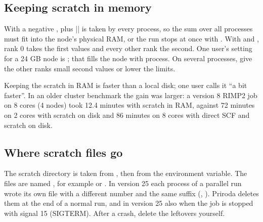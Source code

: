 \documentclass[letterpaper,10pt,english,openany,oneside]{sphinxmanual}
\begin{document}
\subsection{Keeping scratch in memory}
\label{\detokenize{start/running:keeping-scratch-in-memory}}\label{\detokenize{start/running:running-ram-disk}}
\sphinxAtStartPar
With a negative ,  plus || is taken by every process, so the sum over all processes must fit
into the node’s physical RAM, or the run stops at once with . With  and ,
rank 0 takes the first values and every other rank the second. One user’s setting for a 24 GB node is
; that fills the node with  process. On several processes, give the other ranks
small second values or lower the limits.



\sphinxAtStartPar
Keeping the scratch in RAM is faster than a local disk; one user calls it “a bit faster”. In an older cluster
benchmark the gain was larger: a version 8 RI\sphinxhyphen{}MP2 job on 8 cores (4 nodes) took 12.4 minutes with scratch in RAM,
against 72 minutes on 2 cores with scratch on disk and 86 minutes on 8 cores with direct SCF and scratch on disk.




\subsection{Where scratch files go}
\label{\detokenize{start/running:where-scratch-files-go}}\label{\detokenize{start/running:running-scratch}}
\sphinxAtStartPar
The scratch directory is taken from , then from the  environment variable. The files are named
, for example  or . In version 25 each process of a parallel
run wrote its own file with a different number and the same suffix (, ). Priroda deletes
them at the end of a normal run, and in version 25 also when the job is stopped with signal 15 (SIGTERM). After a
crash, delete the leftovers yourself.
\end{document}

